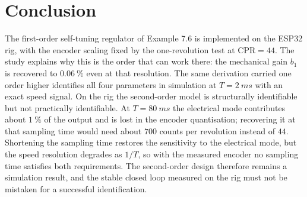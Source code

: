 \section{Conclusion}

The first-order self-tuning regulator of Example 7.6 is implemented on the
ESP32 rig, with the encoder scaling fixed by the one-revolution test at
\(\mathrm{CPR}=44\). The study explains why this is the order that can work
there: the mechanical gain \(b_1\) is recovered to \(\SI{0.06}{\percent}\)
even at that resolution. The same derivation carried one order higher
identifies all four parameters in simulation at \(T=\SI{2}{ms}\) with an exact
speed signal. On the rig the second-order model is structurally identifiable
but not practically identifiable. At \(T=\SI{80}{ms}\) the electrical mode
contributes about \(\SI{1}{\percent}\) of the output and is lost in the encoder
quantisation; recovering it at that sampling time would need about \(700\)
counts per revolution instead of \(44\). Shortening the sampling time restores
the sensitivity to the electrical mode, but the speed resolution degrades as
\(1/T\), so with the measured encoder no sampling time satisfies both
requirements. The second-order design therefore remains a
simulation result, and the stable closed loop measured on the rig must not be
mistaken for a successful identification.
